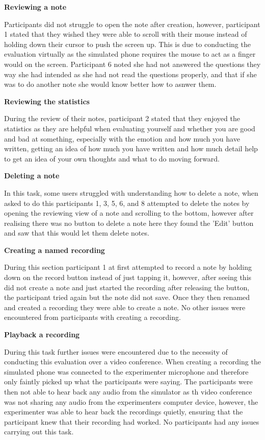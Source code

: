 \documentclass{l4proj}
\begin{document}
\textbf{Reviewing a note}
\par
Participants did not struggle to open the note after creation, however, participant 1 stated that they wished they were able
to scroll with their mouse instead of holding down their cursor to push the screen up. This is due to conducting the 
evaluation virtually as the simulated phone requires the mouse to act as a finger would on the screen. Participant 6 noted 
she had not answered the questions they way she had intended as she had not read the questions properly, and that if she
was to do another note she would know better how to asnwer them.

\textbf{Reviewing the statistics}
\par 
During the review of their notes, participant 2 stated that they enjoyed the statistics as they are helpful when evaluating 
yourself and whether you are good and bad at something, especially with the emotion and how much you have written, getting 
an idea of how much you have written and how much detail help to get an idea of your own thoughts and what to do moving forward.

\textbf{Deleting a note}
\par 
In this task, some users struggled with understanding how to delete a note, when asked to do this participants 1, 3, 5, 6, and 
8 attempted to delete the notes by opening the reviewing view of a note and scrolling to the bottom, however after realising
there was no button to delete a note here they found the 'Edit' button and saw that this would let them delete notes. 

\textbf{Creating a named recording}
\par 
During this section participant 1 at first attempted to record a note by holding down on the record button instead of just tapping 
it, however, after seeing this did not create a note and just started the recording after releasing the button, the participant tried 
again but the note did not save. Once they then renamed and created a recording they were able to create a note. No other issues
were encountered from participants with creating a recording.

\textbf{Playback a recording}
\par 
During this task further issues were encountered due to the necessity of conducting this evaluation over a video conference. 
When creating a recording the simulated phone was connected to the experimenter microphone and therefore only faintly 
picked up what the participants were saying. The participants were then not able to hear back any audio from the simulator
as th video conference was not sharing any audio from the experimenters computer device, however, the experimenter was
able to hear back the recordings quietly, ensuring that the participant knew that their recording had worked. No participants
had any issues carrying out this task.
\end{document}
